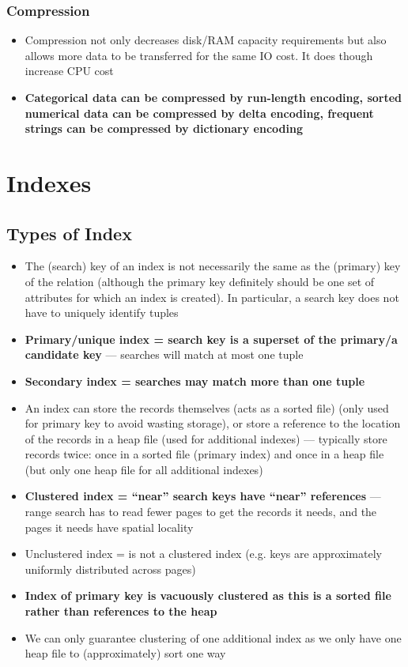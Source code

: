 \documentclass[20pt,a4paper,landscape]{extarticle}
\begin{document}
\begin{flushleft}
\subsubsection{Compression}
\begin{itemize}
\item Compression not only decreases disk/RAM capacity requirements but also allows more data to be transferred for the same IO cost. It does though increase CPU cost
\item \textbf{Categorical data can be compressed by run-length encoding, sorted numerical data can be compressed by delta encoding, frequent strings can be compressed by dictionary encoding}
\end{itemize}
\section{Indexes}
\subsection{Types of Index}
\begin{itemize}
\item The (search) key of an index is not necessarily the same as the (primary) key of the relation (although the primary key definitely should be one set of attributes for which an index is created). In particular, a search key does not have to uniquely identify tuples
\item \textbf{Primary/unique index = search key is a superset of the primary/a candidate key} --- searches will match at most one tuple
\item \textbf{Secondary index = searches may match more than one tuple}
\item An index can store the records themselves (acts as a sorted file) (only used for primary key to avoid wasting storage), or store a reference to the location of the records in a heap file (used for additional indexes) --- typically store records twice: once in a sorted file (primary index) and once in a heap file (but only one heap file for all additional indexes)
\item \textbf{Clustered index = “near” search keys have “near” references} ---
range search has to read fewer pages to get the records it needs, and the pages it needs have spatial locality
\item Unclustered index = is not a clustered index (e.g. keys are approximately uniformly distributed across pages)
\item \textbf{Index of primary key is vacuously clustered as this is a sorted file rather than references to the heap}
\item We can only guarantee clustering of one additional index as we only have one heap file to (approximately) sort one way
\end{itemize}

\end{flushleft}
\end{document}
